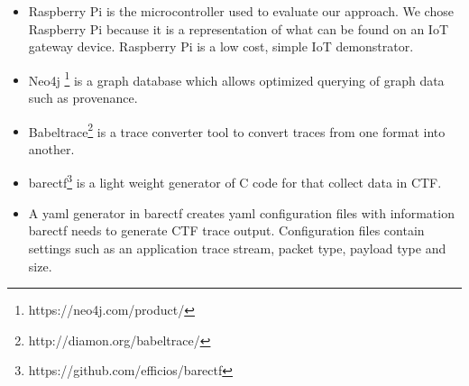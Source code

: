 \documentclass[conference]{IEEEtran}
\begin{document}
\begin{itemize}
\item Raspberry Pi is the microcontroller used to evaluate our approach. We chose Raspberry Pi because it is a representation of what can be found on an IoT gateway device. Raspberry Pi is a low cost, simple IoT demonstrator.


\item Neo4j \footnote{https://neo4j.com/product/} is a graph database which allows optimized querying of graph data such as provenance.


\item Babeltrace\footnote{http://diamon.org/babeltrace/} is a trace converter tool to convert traces from one format into another. 

\item barectf\footnote{https://github.com/efficios/barectf} is a light weight generator of C code for  that collect data in CTF. 

\item  A yaml generator in barectf creates yaml  configuration files with information barectf needs to generate CTF trace output. Configuration  files contain settings such as an application trace stream, packet type, payload type and size. 


\end{itemize}

%
%
%

%
\end{document}
